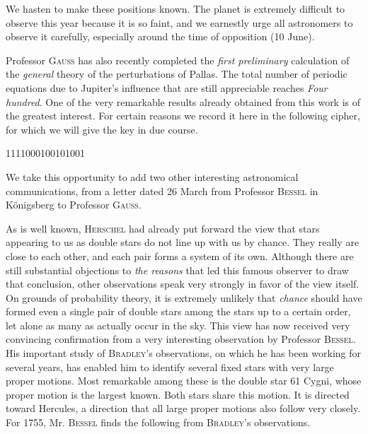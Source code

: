 \par\indent We hasten to make these positions known. The planet is extremely difficult to observe this year because it is so faint, and we earnestly urge all astronomers to observe it carefully, especially around the time of opposition (10 June).

\par\indent Professor \textsc{Gauss} has also recently completed the \emph{first preliminary} calculation of the \emph{general} theory of the perturbations of Pallas. The total number of periodic equations due to Jupiter’s influence that are still appreciable reaches \emph{Four hundred}. One of the very remarkable results already obtained from this work is of the greatest interest. For certain reasons we record it here in the following cipher, for which we will give the key in due course.

\begin{center}
1111000100101001
\end{center}

\par\indent We take this opportunity to add two other interesting astronomical communications, from a letter dated 26 March from Professor \textsc{Bessel} in Königsberg to Professor \textsc{Gauss}.

\par\indent As is well known, \textsc{Herschel} had already put forward the view that stars appearing to us as double stars do not line up with us by chance. They really are close to each other, and each pair forms a system of its own. Although there are still substantial objections to \emph{the reasons} that led this famous observer to draw that conclusion, other observations speak very strongly in favor of the view itself. On grounds of probability theory, it is extremely unlikely that \emph{chance} should have formed even a single pair of double stars among the stars up to a certain order, let alone as many as actually occur in the sky. This view has now received very convincing confirmation from a very interesting observation by Professor \textsc{Bessel}. His important study of \textsc{Bradley}’s observations, on which he has been working for several years, has enabled him to identify several fixed stars with very large proper motions. Most remarkable among these is the double star 61 Cygni, whose proper motion is the largest known. Both stars share this motion. It is directed toward Hercules, a direction that all large proper motions also follow very closely. For 1755, Mr. \textsc{Bessel} finds the following from \textsc{Bradley}’s observations.

